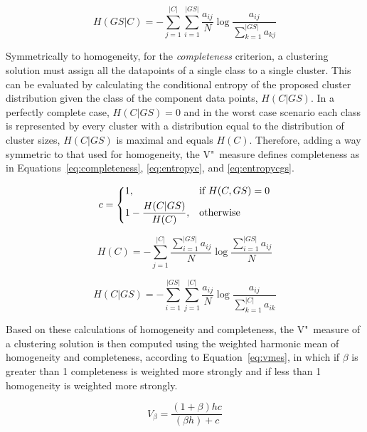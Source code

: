 \begin{equation} \label{eq:entropygsc}
 H(GS|C) = - \sum_{j=1}^{|C|} \sum_{i=1}^{|GS|} \frac{a_{ij}}{N}
           \log \frac{a_{ij}}{\sum_{k=1}^{|GS|} a_{kj}}
\end{equation}

Symmetrically to homogeneity, for the \emph{completeness} criterion, a 
clustering solution must assign all the datapoints of a single class to a 
single cluster. This can be evaluated by calculating the conditional entropy of 
the proposed cluster distribution given the class of the component data points,
$H(C|GS)$. In a perfectly complete case, $H(C|GS) = 0$ and in the worst case
scenario each class is represented by every cluster with a distribution equal to
the distribution of cluster sizes, $H(C|GS)$ is maximal and equals $H(C)$.
Therefore, adding a way symmetric to that used for homogeneity, the V"~measure
defines completeness as in Equations~\ref{eq:completeness}, \ref{eq:entropyc}, 
and \ref{eq:entropycgs}.

\begin{equation} \label{eq:completeness}
 c = \begin{dcases}
      1,                        & \text{if } H(C,GS) = 0 \\
      1 - \frac{H(C|GS)}{H(C)}, & \text{otherwise} \\
     \end{dcases}
\end{equation}

\begin{equation} \label{eq:entropyc}
 H(C) = - \sum_{j=1}^{|C|} \frac{\sum_{i=1}^{|GS|} a_{ij}}{N}
        \log \frac{\sum_{i=1}^{|GS|} a_{ij}}{N}
\end{equation}

\begin{equation} \label{eq:entropycgs}
 H(C|GS) = - \sum_{i=1}^{|GS|} \sum_{j=1}^{|C|} \frac{a_{ij}}{N}
           \log \frac{a_{ij}}{\sum_{k=1}^{|C|} a_{ik}}
\end{equation}

Based on these calculations of homogeneity and completeness, the V"~measure of a
clustering solution is then computed using the weighted harmonic mean of
homogeneity and completeness, according to Equation~\ref{eq:vmes}, in which if
$\beta$ is greater than 1 completeness is weighted more strongly and if less
than 1 homogeneity is weighted more strongly.

\begin{equation} \label{eq:vmes}
 V_\beta = \frac{(1+\beta)hc}{(\beta h) + c}
\end{equation}

